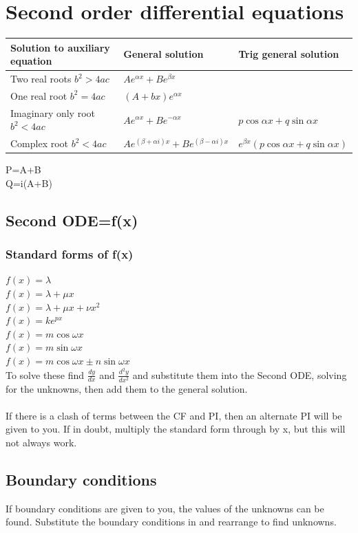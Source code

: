 \documentclass{article}[18pt]
\begin{document}
\section{Second order differential equations}
{\renewcommand{\arraystretch}{2}
\begin{tabularx}{\textwidth}{|X|X|X|}
\hline
\textbf{Solution to auxiliary equation}&\textbf{General solution}&\textbf{Trig general solution}\\
\hline
Two real roots $b^2>4ac$&$Ae^{\alpha x}+Be^{\beta x}$&\\
\hline
One real root $b^2=4ac$&$(A+bx)e^{\alpha x}$&\\
\hline
Imaginary only root $b^2<4ac$&$Ae^{\alpha x}+Be^{-\alpha x}$&
$p\cos\alpha x+q\sin\alpha x$
\\
\hline
Complex root $b^2<4ac$&$Ae^{(\beta+\alpha i)x}+Be^{(\beta-\alpha i)x}$&
$e^{\beta x}(p\cos\alpha x+q\sin\alpha x)$
\\
\hline
\end{tabularx}}
P=A+B\\
Q=i(A+B)
\subsection{Second ODE=f(x)}
\subsubsection{Standard forms of f(x)}
$f(x)=\lambda$\\
$f(x)=\lambda+\mu x$\\
$f(x)=\lambda+\mu x+\nu x^2$\\
$f(x)=ke^{px}$\\
$f(x)=m\cos\omega x$\\
$f(x)=m\sin\omega x$\\
$f(x)=m\cos\omega x\pm n\sin\omega x$
\\
To solve these find $\frac{dy}{dx}$ and $\frac{d^2y}{dx^2}$ and substitute them into the Second ODE, solving for the unknowns, then add them to the general solution.\\
\\
If there is a clash of terms between the CF and PI, then an alternate PI will be given to you. If in doubt, multiply the standard form through by x, but this will not always work.
\subsection{Boundary conditions}
If boundary conditions are given to you, the values of the unknowns can be found. Substitute the boundary conditions in and rearrange to find unknowns.
\newpage
\end{document}
